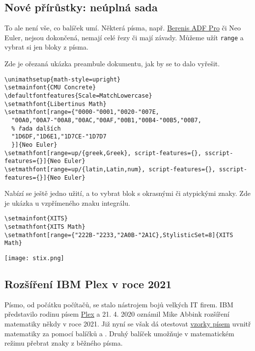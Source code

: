 \subsection{Nové přírůstky: neúplná sada}

To ale není vše, co balíček \href{https://ctan.org/pkg/unicode-math}{} umí.
Některá písma, např. 
\href{http://arkandis.tuxfamily.org/adffonts.html}{Berenis ADF Pro}
či
Neo Euler, 
nejsou dokončená, nemají celé řezy či mají závady. 
Můžeme užít {\tt range} a vybrat si jen bloky z písma.

Zde je ořezaná ukázka preambule dokumentu, jak by se to dalo vyřešit.

\begin{lstlisting}
\unimathsetup{math-style=upright}
\setmainfont{CMU Concrete}
\defaultfontfeatures{Scale=MatchLowercase}
\setmathfont{Libertinus Math}
\setmathfont[range={"0000-"0001,"0020-"007E,
  "00A0,"00A7-"00A8,"00AC,"00AF,"00B1,"00B4-"00B5,"00B7,
  % řada dalších
  "1D6DF,"1D6E1,"1D7CE-"1D7D7
  }]{Neo Euler}
\setmathfont[range=up/{greek,Greek}, script-features={}, sscript-features={}]{Neo Euler}
\setmathfont[range=up/{latin,Latin,num}, script-features={}, sscript-features={}]{Neo Euler}
\end{lstlisting}


Nabízí se ještě jedno užití, a to vybrat blok s okrasnými či atypickými znaky. Zde je ukázka u vzpřímeného znaku integrálu.

\begin{lstlisting}
\setmainfont{XITS}
\setmathfont{XITS Math}
\setmathfont[range={"222B-"2233,"2A0B-"2A1C},StylisticSet=8]{XITS Math}
\end{lstlisting}

\noindent
\texttt{[image: stix.png]}




\subsection{Rozšíření IBM Plex v roce 2021}

Písmo, od počátku počítačů, se stalo nástrojem bojů velkých IT firem. IBM představilo rodinu písem
\href{https://www.ibm.com/plex/}{Plex} a 21. 4. 2020 oznámil Mike Abbink rozšíření matematiky někdy v roce 2021. Již nyní se však dá otestovat \href{https://github.com/IBM/plex}{vzorky písem} uvnitř matematiky za pomocí balíčků
\href{https://ctan.org/pkg/plex}{} 
a 
\href{https://ctan.org/pkg/mathastext}{}.
Druhý balíček umožňuje v matematickém režimu přebrat znaky z běžného písma.

